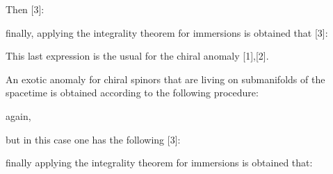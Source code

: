 \documentclass[a4paper,a4paper]{article}
\begin{document}
\begin{center}
\setlength{\baselineskip}{40pt}
 {  \coordHE{} }
\end{center}
\begin{center}
\setlength{\baselineskip}{40pt}
 {  \coordHE{} }
\end{center}

Then [3]:

\begin{center}
\setlength{\baselineskip}{40pt}
 {  \coordHE{}
}
\end{center}
\begin{center}
\setlength{\baselineskip}{40pt}
 {  \coordHE{}
}
\end{center}
finally, applying the integrality theorem for immersions is obtained that [3]:
\begin{center}
\setlength{\baselineskip}{40pt}
 {  \coordHE{}
}
\end{center}

This last expression is the usual for the chiral anomaly [1],[2].

An exotic anomaly for chiral spinors that are living on submanifolds of the spacetime
is obtained according to the following procedure:

again,
\begin{center}
\setlength{\baselineskip}{40pt}
 {  \coordHE{} }
\end{center}
\begin{center}
\setlength{\baselineskip}{40pt}
 {  \coordHE{} }
\end{center}

but in this case one has the following [3]:
\begin{center}
\setlength{\baselineskip}{40pt}
 {  \coordHE{}
}
\end{center}
\begin{center}
\setlength{\baselineskip}{40pt}
 {  \coordHE{} }
\end{center}
finally applying the integrality theorem for immersions is obtained that:
\begin{center}
\setlength{\baselineskip}{40pt}
 {  \coordHE{} }
\end{center}
\end{document}
